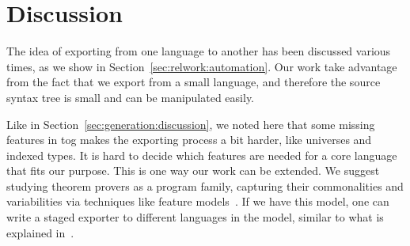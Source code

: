
\section{Discussion}
\label{sec:exporting:discussion}
The idea of exporting from one language to another has been discussed various times, as we show in Section~\ref{sec:relwork:automation}. Our work take advantage from the fact that we export from a small language, and therefore the source syntax tree is small and can be manipulated easily.  

Like in Section~\ref{sec:generation:discussion}, we noted here that some missing features in tog makes the exporting process a bit harder, like universes and indexed types. It is hard to decide which features are needed for a core language that fits our purpose. This is one way our work can be extended. We suggest studying theorem provers as a program family, capturing their commonalities and variabilities via techniques like feature models~\cite{czarnecki2000generative}. If we have this model, one can write a staged exporter to different languages in the model, similar to what is explained in~\cite{stagedConfig}. 


